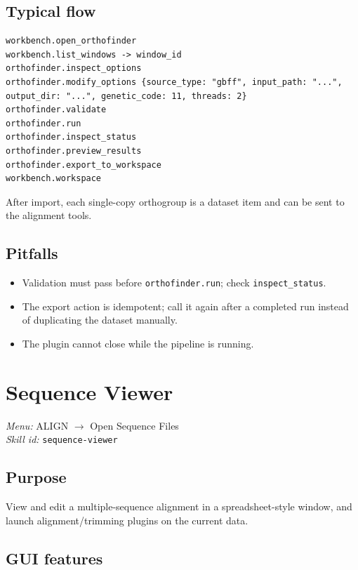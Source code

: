 \documentclass[11pt]{report}
\begin{document}
\subsection{Typical flow}

\begin{lstlisting}
workbench.open_orthofinder
workbench.list_windows -> window_id
orthofinder.inspect_options
orthofinder.modify_options {source_type: "gbff", input_path: "...", output_dir: "...", genetic_code: 11, threads: 2}
orthofinder.validate
orthofinder.run
orthofinder.inspect_status
orthofinder.preview_results
orthofinder.export_to_workspace
workbench.workspace
\end{lstlisting}

After import, each single-copy orthogroup is a dataset item and can be sent to the alignment tools.

\subsection{Pitfalls}

\begin{itemize}
  \item Validation must pass before \texttt{orthofinder.\allowbreak run}; check \texttt{inspect\_\allowbreak status}.
  \item The export action is idempotent; call it again after a completed run instead of duplicating the dataset manually.
  \item The plugin cannot close while the pipeline is running.
\end{itemize}


\section{Sequence Viewer}
\noindent\textit{Menu:} ALIGN $\rightarrow$ Open Sequence Files\\
\noindent\textit{Skill id:} \texttt{sequence-viewer}

\subsection{Purpose}

View and edit a multiple-sequence alignment in a spreadsheet-style window, and launch alignment/trimming plugins on the current data.

\subsection{GUI features}
\end{document}
